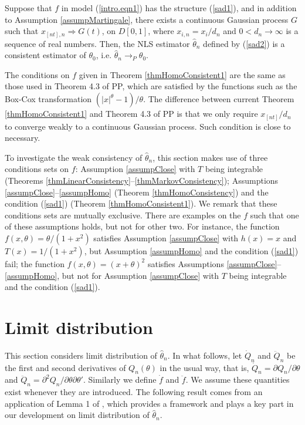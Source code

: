 \begin{thm}  Suppose that $f$ in model (\ref {intro.eqn1}) has the structure (\ref {sad1}), and in addition to Assumption \ref{assumpMartingale}, there exists a continuous Gaussian process $G$ such that $x_{[nt], n} \Rightarrow G(t)$, on $D[0,1]$, where $x_{i,n} = x_i / d_n$  and $0 < d_n \to \infty$ is a sequence of real numbers. Then,
 the NLS estimator $\hat{\theta}_n$ defined by (\ref {sad2}) is a consistent estimator of $\theta_0$, i.e. $\hat{\theta}_n \rightarrow_P \theta_0$.
\end{thm}





 The conditions on $f$ given in Theorem \ref {thmHomoConsistent1} are the same as those used in Theorem 4.3 of PP, which are satisfied by the functions such as  the Box-Cox transformation $(|x|^\theta - 1)/\theta$. The difference between current Theorem \ref{thmHomoConsistent1} and Theorem 4.3 of PP is that we only require $x_{[nt]} / d_n$ to converge weakly to a continuous Gaussian  process. Such condition is close to necessary.


To investigate the weak consistency of $\hat\theta_n$, this section makes use of three conditions sets on $f$: Assumption \ref{assumpClose} with $T$ being integrable (Theorems \ref{thmLinearConsistency}--\ref{thmMarkovConsistency}); Assumptions \ref{assumpClose}--\ref{assumpHomo} (Theorem \ref{thmHomoConsistency}) and the condition (\ref {sad1}) (Theorem \ref{thmHomoConsistent1}). We remark that these conditions sets are mutually exclusive. There are examples on the $f$ such that one of these assumptions holds, but not for other two. For instance, the function $f(x, \theta)=\theta/(1+x^2)$ satisfies Assumption \ref{assumpClose}  with $h(x)=x$ and $T(x)=1/(1+x^2)$, but Assumption \ref{assumpHomo} and  the condition (\ref {sad1}) fail; the function $f(x, \theta)=(x+\theta)^2$ satisfies Assumptions \ref{assumpClose}--\ref{assumpHomo}, but not for Assumption \ref{assumpClose} with $T$ being integrable and the condition (\ref {sad1}).


\section{Limit distribution} 
This section considers  limit distribution of $\hat{\theta}_n$. In what follows,  let $\dot{Q}_n$ and $\ddot{Q}_n$ be the first and second derivatives of $Q_n(\theta)$ in the usual way, that is, $\dot{Q}_n=\partial Q_n / \partial \theta$ and $\ddot{Q}_n=\partial^2 Q_n / \partial \theta \partial \theta'$. Similarly we define $\dot{f}$  and $\ddot{f}$. We assume these quantities exist whenever they are introduced. The following result  comes from an application of Lemma 1 of \cite{andrewssun2004}, which provides a framework and plays a key part in our development on limit distribution of $\hat{\theta}_n$.

